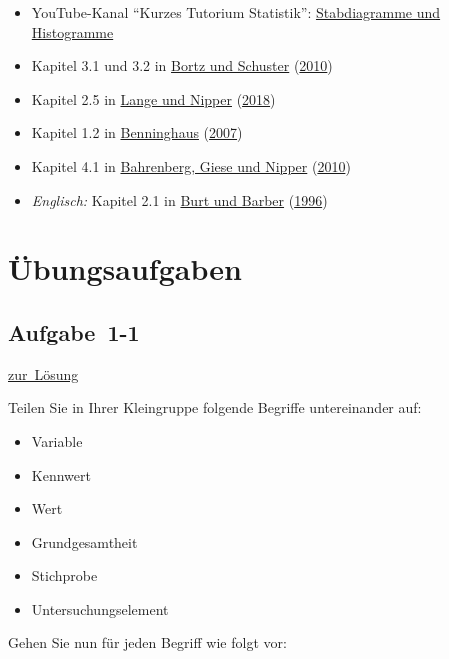 \documentclass[
  11pt,
  ngerman,
  a4paper,
]{report}
\providecommand{\tightlist}{%
  \setlength{\itemsep}{0pt}\setlength{\parskip}{0pt}}
\begin{document}
\begin{itemize}
\tightlist
\item
  YouTube-Kanal \enquote{Kurzes Tutorium Statistik}: \href{https://www.youtube.com/watch?v=LkOBRWXnTRQ}{Stabdiagramme und Histogramme}
\item
  Kapitel 3.1 und 3.2 in \protect\hyperlink{ref-bortz}{Bortz und Schuster} (\protect\hyperlink{ref-bortz}{2010})
\item
  Kapitel 2.5 in \protect\hyperlink{ref-delange}{Lange und Nipper} (\protect\hyperlink{ref-delange}{2018})
\item
  Kapitel 1.2 in \protect\hyperlink{ref-benninghaus}{Benninghaus} (\protect\hyperlink{ref-benninghaus}{2007})
\item
  Kapitel 4.1 in \protect\hyperlink{ref-bahrenberg}{Bahrenberg, Giese und Nipper} (\protect\hyperlink{ref-bahrenberg}{2010})
\item
  \emph{Englisch:} Kapitel 2.1 in \protect\hyperlink{ref-burt}{Burt und Barber} (\protect\hyperlink{ref-burt}{1996})
\end{itemize}

\hypertarget{uxfcbungsaufgaben}{%
\section*{Übungsaufgaben}\label{uxfcbungsaufgaben}}

\hypertarget{aufgabe-1-1}{%
\subsection{Aufgabe~1-1}\label{aufgabe-1-1}}

\protect\hyperlink{loesung-1-1}{zur~Lösung}

Teilen Sie in Ihrer Kleingruppe folgende Begriffe untereinander auf:

\begin{itemize}
\tightlist
\item
  Variable
\item
  Kennwert
\item
  Wert
\item
  Grundgesamtheit
\item
  Stichprobe
\item
  Untersuchungselement
\end{itemize}

Gehen Sie nun für jeden Begriff wie folgt vor:
\end{document}
